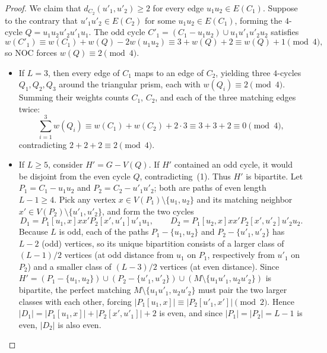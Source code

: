 \documentclass[10pt,letterpaper]{article}
\theoremstyle{zetaplain}
\theoremstyle{zetadef}
\theoremstyle{remark}
\numberwithin{equation}{section}
\begin{document}
\begin{proof}
We claim that $d_{C_2}(u'_1, u'_2) \ge 2$ for every edge $u_1 u_2 \in E(C_1)$. Suppose to the contrary that $u'_1 u'_2 \in E(C_2)$ for some $u_1 u_2 \in E(C_1)$, forming the $4$-cycle $Q = u_1 u_2 u'_2 u'_1 u_1$. The odd cycle $C'_1 = (C_1 - u_1 u_2) \cup u_1 u'_1 u'_2 u_2$ satisfies
\[
  w(C'_1) \equiv w(C_1) + w(Q) - 2w(u_1 u_2) \equiv 3 + w(Q) + 2 \equiv w(Q) + 1 \pmod 4,
\]
so NOC forces $w(Q) \equiv 2 \pmod 4$.
\begin{itemize}
  \item If $L = 3$, then every edge of $C_1$ maps to an edge of $C_2$, yielding three $4$-cycles $Q_1, Q_2, Q_3$ around the triangular prism, each with $w(Q_i) \equiv 2 \pmod 4$. Summing their weights counts $C_1$, $C_2$, and each of the three matching edges twice:
  \[
    \sum_{i=1}^3 w(Q_i) \equiv w(C_1) + w(C_2) + 2 \cdot 3 \equiv 3 + 3 + 2 \equiv 0 \pmod 4,
  \]
  contradicting $2 + 2 + 2 \equiv 2 \pmod 4$.
  \item If $L \ge 5$, consider $H' = G - V(Q)$. If $H'$ contained an odd cycle, it would be disjoint from the even cycle $Q$, contradicting~(1). Thus $H'$ is bipartite. Let $P_1 = C_1 - u_1 u_2$ and $P_2 = C_2 - u'_1 u'_2$; both are paths of even length $L - 1 \ge 4$. Pick any vertex $x \in V(P_1) \setminus \{u_1, u_2\}$ and its matching neighbor $x' \in V(P_2) \setminus \{u'_1, u'_2\}$, and form the two cycles
  \[
    D_1 = P_1[u_1, x] x x' P_2[x', u'_1] u'_1 u_1, \qquad D_2 = P_1[u_2, x] x x' P_2[x', u'_2] u'_2 u_2.
  \]
  Because $L$ is odd, each of the paths $P_1 - \{u_1, u_2\}$ and $P_2 - \{u'_1, u'_2\}$ has $L - 2$ (odd) vertices, so its unique bipartition consists of a larger class of $(L - 1)/2$ vertices (at odd distance from $u_1$ on $P_1$, respectively from $u'_1$ on $P_2$) and a smaller class of $(L - 3)/2$ vertices (at even distance). Since $H' = (P_1 - \{u_1, u_2\}) \cup (P_2 - \{u'_1, u'_2\}) \cup (M \setminus \{u_1 u'_1, u_2 u'_2\})$ is bipartite, the perfect matching $M \setminus \{u_1 u'_1, u_2 u'_2\}$ must pair the two larger classes with each other, forcing $|P_1[u_1, x]| \equiv |P_2[u'_1, x']| \pmod 2$. Hence $|D_1| = |P_1[u_1, x]| + |P_2[x', u'_1]| + 2$ is even, and since $|P_1| = |P_2| = L - 1$ is even, $|D_2|$ is also even.


\end{itemize}
\end{proof}
\end{document}

